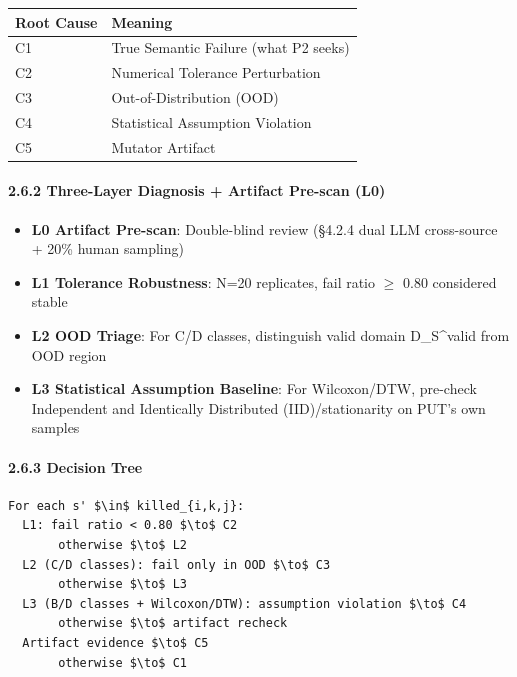 \documentclass[review,12pt,authoryear]{elsarticle}
\providecommand{\tightlist}{\setlength{\itemsep}{0pt}\setlength{\parskip}{0pt}}
\begin{document}
{\def\LTcaptype{none} %
\begin{longtable}[]{@{}ll@{}}
\toprule\noalign{}
Root Cause & Meaning \\
\midrule\noalign{}
\endhead
\bottomrule\noalign{}
\endlastfoot
C1 & True Semantic Failure (what P2 seeks) \\
C2 & Numerical Tolerance Perturbation \\
C3 & Out-of-Distribution (OOD) \\
C4 & Statistical Assumption Violation \\
C5 & Mutator Artifact \\
\end{longtable}
}

\paragraph{2.6.2 Three-Layer Diagnosis + Artifact Pre-scan
(L0)}\label{three-layer-diagnosis-artifact-pre-scan-l0}

\begin{itemize}
\tightlist
\item
  \textbf{L0 Artifact Pre-scan}: Double-blind review (§4.2.4 dual LLM
  cross-source + 20\% human sampling)
\item
  \textbf{L1 Tolerance Robustness}: N=20 replicates, fail ratio $\geq$ 0.80
  considered stable
\item
  \textbf{L2 OOD Triage}: For C/D classes, distinguish valid domain
  D\_S\^{}valid from OOD region
\item
  \textbf{L3 Statistical Assumption Baseline}: For Wilcoxon/DTW,
  pre-check Independent and Identically Distributed (IID)/stationarity
  on PUT's own samples
\end{itemize}

\paragraph{2.6.3 Decision Tree}\label{decision-tree}

\begin{verbatim}
For each s' $\in$ killed_{i,k,j}:
  L1: fail ratio < 0.80 $\to$ C2
       otherwise $\to$ L2
  L2 (C/D classes): fail only in OOD $\to$ C3
       otherwise $\to$ L3
  L3 (B/D classes + Wilcoxon/DTW): assumption violation $\to$ C4
       otherwise $\to$ artifact recheck
  Artifact evidence $\to$ C5
       otherwise $\to$ C1
\end{verbatim}
\end{document}
